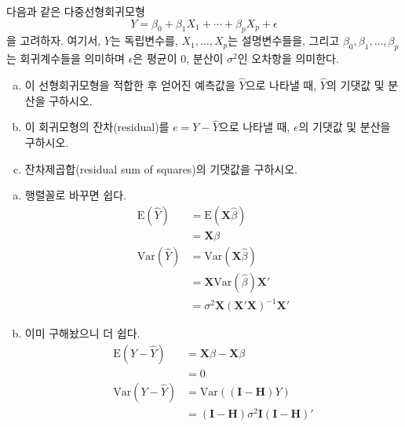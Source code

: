 \documentclass[answers]{exam}
\begin{document}
\newpage
{}
\begin{questions}
   \question
    다음과 같은 다중선형회귀모형
    $$
      Y=\beta_{0}+\beta_{1}X_{1}+\cdots+\beta_{p}X_{p}+\epsilon
    $$
    을 고려하자. 여기서, $Y$는 독립변수를, $X_{1},\ldots,X_{p}$는 설명변수들을, 그리고 $\beta_{0},\beta_{1},\ldots,\beta_{p}$는 회귀계수들을 의미하며 $\epsilon$은 평균이 0, 분산이 $\sigma^{2}$인 오차항을 의미한다.
    \begin{enumerate}[(a)]
      \item 이 선형회귀모형을 적합한 후 얻어진 예측값을 $\widehat{Y}$으로 나타낼 때, $\widehat{Y}$의 기댓값 및 분산을 구하시오.
      \item 이 회귀모형의 잔차(residual)를 $e=Y-\widehat{Y}$으로 나타낼 때, $e$의 기댓값 및 분산을 구하시오.
      \item 잔차제곱합(residual sum of squares)의 기댓값을 구하시오.
    \end{enumerate}
    \begin{solution}
      \begin{enumerate}[(a)]
        \item 행렬꼴로 바꾸면 쉽다.
        \begin{align}
          \mathrm{E}\left(\widehat{Y}\right) &= \mathrm{E}\left(\mathbf{X}\widehat{\beta}\right)\\
          &=\mathbf{X}\beta\\
          \mathrm{Var}\left(\widehat{Y}\right) &= \mathrm{Var}\left(\mathbf{X}\widehat{\beta}\right)\\
          &= \mathbf{X}\mathrm{Var}\left(\widehat{\beta}\right)\mathbf{X}'\\
          &=\sigma^{2}\mathbf{X}\left(\mathbf{X}'\mathbf{X}\right)^{-1}\mathbf{X}'
        \end{align}
        \item 이미 구해놨으니 더 쉽다.
        \begin{align}
          \mathrm{E}\left(Y-\widehat{Y}\right) &= \mathbf{X}\beta-\mathbf{X}\beta\\
          &= 0\\
          \mathrm{Var}\left(Y-\widehat{Y}\right) &= \mathrm{Var}\left(\left(\mathbf{I}-\mathbf{H}\right)Y\right)\\
          &= \left(\mathbf{I}-\mathbf{H}\right)\sigma^{2}\mathbf{I}\left(\mathbf{I}-\mathbf{H}\right)'\\

\end{align}
\end{enumerate}
\end{solution}
\end{questions}
\end{document}
